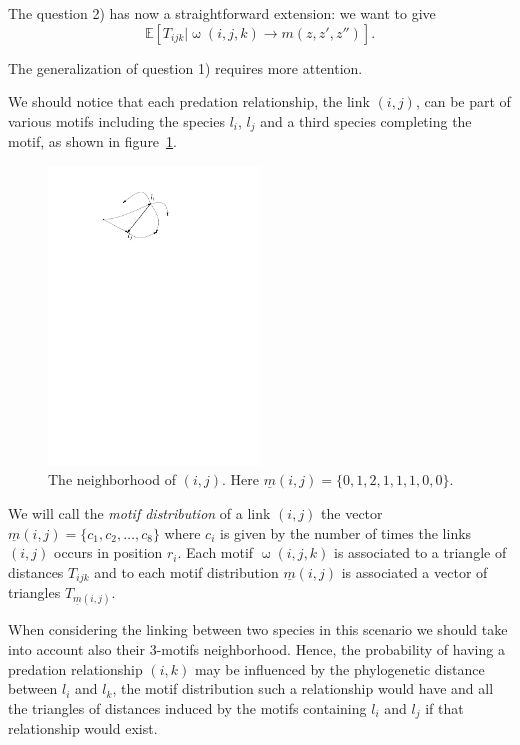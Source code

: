 \documentclass[12pt,a4paper]{report}
\begin{document}
The question 2) has now a straightforward extension: we want to give \[\mathbb{E}\left[T_{ijk}|\upomega(i,j,k) \to m(z,z',z'')\right].\]

The generalization of question 1) requires more attention.

We should notice that each predation relationship, the link $(i,j)$, can be part of various motifs including the species $l_i$, $l_j$ and a third species completing the motif, as shown in figure~\ref{fig:starij}.
\begin{figure}[ht]
	\centering
		\includegraphics[width=0.5\textwidth]{images/starij}
		\caption{The neighborhood of $(i,j)$. Here $\underline{m}(i,j)=\{0,1,2,1,1,1,0,0\}$.}
		\label{fig:starij}
\end{figure}

We will call the \emph{motif distribution} of a link $(i,j)$ the vector $\underline{m}(i,j)=\{c_1,c_2,\dots,c_8\}$ where $c_i$ is given by the number of times the links $(i,j)$ occurs in position $r_i$. Each motif $\upomega(i,j,k)$ is associated to a triangle of distances $T_{ijk}$ and to each motif distribution $\underline{m}(i,j)$ is associated a vector of triangles $T_{\underline{m}(i,j)}$.

When considering the linking between two species in this scenario we should take into account also their 3-motifs neighborhood. Hence, the probability of having a predation relationship $(i,k)$ may be influenced by the phylogenetic distance between $l_i$ and $l_k$, the motif distribution such a relationship would have and all the triangles of distances induced by the motifs containing $l_i$ and $l_j$ if that relationship would exist.
\end{document}
